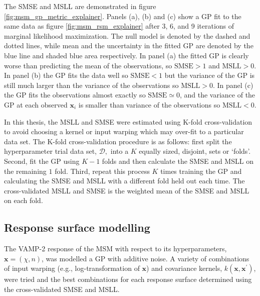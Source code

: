 The SMSE and MSLL are demonstrated in figure \ref{fig:msm_gp_metric_explainer}. Panels (a), (b) and (c) show a GP fit to the same data as figure \ref{fig:msm_rsm_explainer} after 3, 6, and 9 iterations of marginal likelihood maximization. The null model is denoted by the dashed and dotted lines, while mean and the uncertainty in the fitted GP are denoted by the blue line and shaded blue area respectively.  In panel (a) the fitted GP is clearly worse than predicting the mean of the observations, so  $\mathrm{SMSE} > 1$ and  $\mathrm{MSLL} > 0$. In panel (b) the GP fits the data well so $\mathrm{SMSE} < 1$ but the variance of the GP is still much larger than the variance of the observations so $\mathrm{MSLL} > 0$. In panel (c) the GP fits the observations almost exactly so $\mathrm{SMSE} \simeq 0$, and the variance of the GP at each observed $\mathbf{x}_{i}$ is smaller than variance of the observations so $\mathrm{MSLL} < 0$. 

In this thesis, the MSLL and SMSE were estimated using K-fold cross-validation\cite{friedman2001elements} to avoid choosing a kernel or input warping which may over-fit to a particular data set. The K-fold cross-validation procedure is as follows\cite{friedman2001elements}: first split the hyperparameter trial data set, $\mathcal{D},$ into a $K$ equally sized, disjoint, sets or `folds'. Second, fit the GP using $K-1$ folds and then calculate the SMSE and MSLL on the remaining $1$ fold. Third, repeat this process $K$ times training the GP and calculating the SMSE and MSLL with a different fold held out each time. The cross-validated MSLL and SMSE is the weighted mean of the SMSE and MSLL on each fold. 

\subsection{Response surface modelling}\label{subsec:rsm}
The VAMP-2 response of the MSM with respect to its hyperparameters, $\mathbf{x} = (\chi, n)$, was modelled a GP with additive noise. A variety of combinations of input warping (e.g., log-transformation of $\mathbf{x}$) and covariance kernels, $k(\mathbf{x}, \mathbf{x}^{\prime})$,  were tried and the best combinations for each response surface determined using the cross-validated SMSE and MSLL. 

